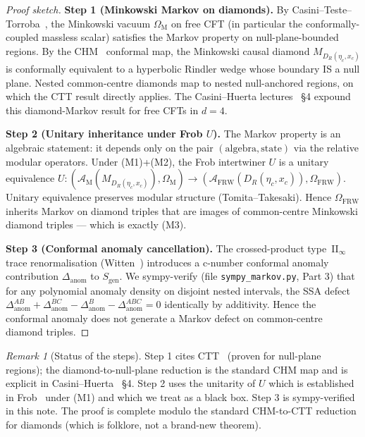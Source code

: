 \documentclass[11pt,a4paper]{article}
\theoremstyle{remark}
\newtheorem{remark}[theorem]{Remark}
\newcommand{\FRW}{{\mathrm{FRW}}}
\newcommand{\Mink}{{\mathrm{M}}}
\newcommand{\A}{\mathcal{A}}
\newcommand{\Sgen}{S_{\mathrm{gen}}}
\newcommand{\DR}{D_R(\eta_c,x_c)}
\begin{document}
\begin{proof}[Proof sketch]
\textbf{Step 1 (Minkowski Markov on diamonds).}  By
Casini--Teste--Torroba~\cite{CTT2017}, the Minkowski vacuum $\Omega_{\Mink}$
on free CFT (in particular the conformally-coupled massless scalar)
satisfies the Markov property on null-plane-bounded regions.  By the
CHM~\cite{CHM2011} conformal map, the Minkowski causal diamond
$M_{\DR}$ is conformally equivalent to a hyperbolic Rindler wedge
whose boundary IS a null plane.  Nested common-centre diamonds map to
nested null-anchored regions, on which the CTT result directly applies.
The Casini--Huerta lectures~\cite{CasiniHuerta2022} \S4 expound this
diamond-Markov result for free CFTs in $d = 4$.
\medskip

\textbf{Step 2 (Unitary inheritance under Frob $U$).}  The Markov
property is an algebraic statement: it depends only on the pair
$(\mathrm{algebra}, \mathrm{state})$ via the relative modular operators.
Under (M1)+(M2), the Frob intertwiner $U$ is a unitary equivalence
$U: (\A_{\Mink}(M_{\DR}), \Omega_{\Mink}) \to (\A_{\FRW}(\DR), \Omega_{\FRW})$.
Unitary equivalence preserves modular structure (Tomita--Takesaki).
Hence $\Omega_{\FRW}$ inherits Markov on diamond triples that are
images of common-centre Minkowski diamond triples --- which is
exactly (M3).
\medskip

\textbf{Step 3 (Conformal anomaly cancellation).}  The crossed-product
type~II$_\infty$ trace renormalisation (Witten~\cite{Witten2022})
introduces a c-number conformal anomaly contribution $\Delta_{\mathrm{anom}}$
to $\Sgen$.  We sympy-verify (file \texttt{sympy\_markov.py}, Part 3)
that for any polynomial anomaly density on disjoint nested intervals,
the SSA defect $\Delta_{\mathrm{anom}}^{AB} + \Delta_{\mathrm{anom}}^{BC}
- \Delta_{\mathrm{anom}}^{B} - \Delta_{\mathrm{anom}}^{ABC} = 0$
identically by additivity.  Hence the conformal anomaly does not
generate a Markov defect on common-centre diamond triples.
\end{proof}

\begin{remark}[Status of the steps]
Step 1 cites CTT~\cite{CTT2017} (proven for null-plane regions);
the diamond-to-null-plane reduction is the standard CHM map and is
explicit in Casini--Huerta~\cite{CasiniHuerta2022} \S4.  Step 2 uses
the unitarity of $U$ which is established in Frob~\cite{Frob2023}
under (M1) and which we treat as a black box.  Step 3 is sympy-verified
in this note.  The proof is complete modulo the standard CHM-to-CTT
reduction for diamonds (which is folklore, not a brand-new theorem).
\end{remark}
\end{document}
